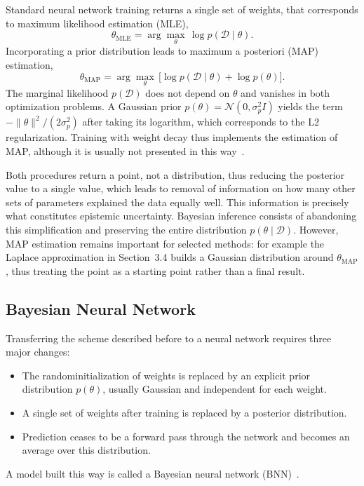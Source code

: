 Standard neural network training returns a single set of weights, that corresponds to maximum
likelihood estimation (MLE),
%
\begin{equation}
    \theta_{\mathrm{MLE}} = \arg\max_{\theta} \, \log p(\mathcal{D} \mid \theta) .
    \label{eq:mle}
\end{equation}
%
Incorporating a prior distribution leads to maximum a posteriori (MAP) estimation,
%
\begin{equation}
    \theta_{\mathrm{MAP}}
    = \arg\max_{\theta} \,
      \bigl[\log p(\mathcal{D} \mid \theta) + \log p(\theta)\bigr] .
    \label{eq:map}
\end{equation}
%
The marginal likelihood $p(\mathcal{D})$ does not depend on $\theta$ and vanishes in both optimization problems. A Gaussian prior $p(\theta) = \mathcal{N}(0, \sigma_p^2 I)$ yields the term
$-\lVert \theta \rVert^2 / (2\sigma_p^2)$ after taking its logarithm, which corresponds to the L2
regularization. Training with weight decay thus implements the estimation of MAP, although it is
usually not presented in this way~\cite{jospin2022}.

Both procedures return a point, not a distribution, thus reducing the posterior value to a single value, which leads to removal of information on how many other sets of parameters explained the data equally well. This information is precisely what constitutes epistemic uncertainty. Bayesian inference consists of abandoning this simplification and preserving the entire distribution $p(\theta \mid \mathcal{D})$. However, MAP estimation remains important for selected methods: for example the Laplace approximation in Section~3.4 builds a Gaussian distribution around $\theta_{\mathrm{MAP}}$, thus treating the point as a starting point rather than a final result.

\subsection{Bayesian Neural Network}
\label{subsec:bnn-formalism}

Transferring the scheme described before to a neural network requires three major changes: 
\begin{itemize}
    \item The randominitialization of weights is replaced by an explicit prior distribution $p(\theta)$, usually Gaussian and independent for each weight.
    \item A single set of weights after training is replaced by a posterior distribution.
    \item Prediction ceases to be a forward pass through the network and becomes an average over this distribution.
\end{itemize}
A model built this way is called a Bayesian neural network (BNN)~\cite{jospin2022}.

